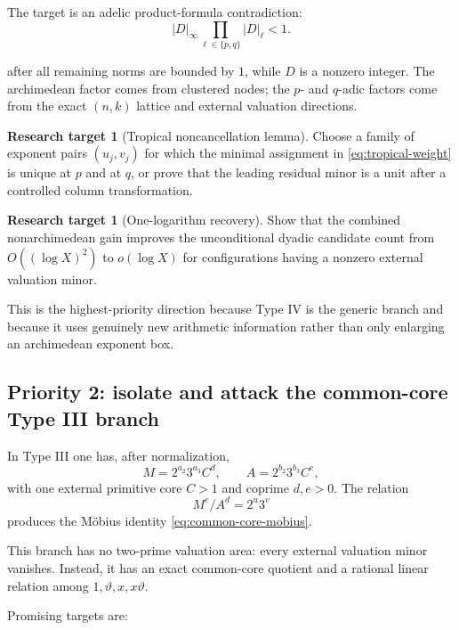 \documentclass[11pt,oneside]{article}
\theoremstyle{definition}
\newtheorem{problem}[theorem]{Research target}
\theoremstyle{remark}
\begin{document}
The target is an adelic product-formula contradiction:
\[
  |D|_\infty
  \prod_{\ell\in\{p,q\}}|D|_\ell
  <1.
\]

after all remaining norms are bounded by $1$, while $D$ is a nonzero integer.  The
archimedean factor comes from clustered nodes; the $p$- and $q$-adic factors come from the
exact $(n,k)$ lattice and external valuation directions.

\begin{problem}[Tropical noncancellation lemma]
Choose a family of exponent pairs $(u_j,v_j)$ for which the minimal assignment in
\eqref{eq:tropical-weight} is unique at $p$ and at $q$, or prove that the leading residual
minor is a unit after a controlled column transformation.
\end{problem}

\begin{problem}[One-logarithm recovery]
Show that the combined nonarchimedean gain improves the unconditional dyadic candidate count
from $O((\log X)^2)$ to $o(\log X)$ for configurations having a nonzero external valuation
minor.
\end{problem}

This is the highest-priority direction because Type IV is the generic branch and because it
uses genuinely new arithmetic information rather than only enlarging an archimedean
exponent box.

\subsection{Priority 2: isolate and attack the common-core Type III branch}

In Type III one has, after normalization,
\[
  M=2^{a_2}3^{a_3}C^d,
  \qquad
  A=2^{b_2}3^{b_3}C^e,
\]
with one external primitive core $C>1$ and coprime $d,e>0$.  The relation
\[
  M^e/A^d=2^u3^v
\]
produces the M\"obius identity \eqref{eq:common-core-mobius}.

This branch has no two-prime valuation area: every external valuation minor vanishes.
Instead, it has an exact common-core quotient and a rational linear relation among
$1,\vartheta,x,x\vartheta$.

Promising targets are:
\end{document}

